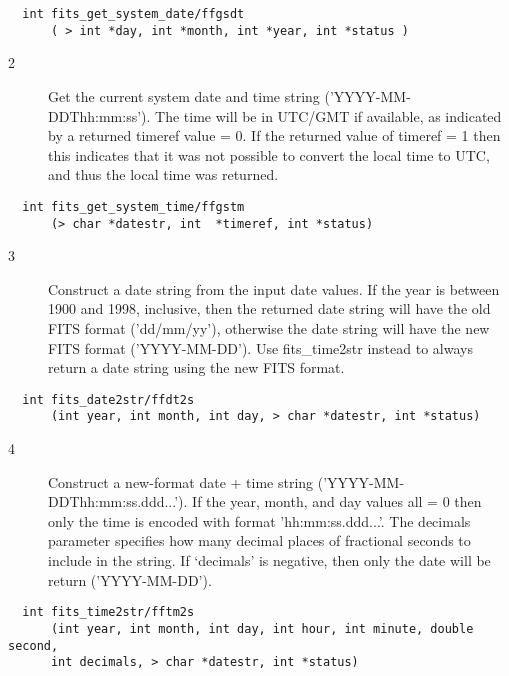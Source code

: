 \documentclass[11pt]{book}
\begin{document}
\begin{verbatim}
  int fits_get_system_date/ffgsdt
      ( > int *day, int *month, int *year, int *status )
\end{verbatim}


\begin{description}
\item[2 ] Get the current system date and time string ('YYYY-MM-DDThh:mm:ss').
The time will be in UTC/GMT if available, as indicated by a returned timeref
value = 0.  If the returned value of timeref = 1 then this indicates that
it was not possible to convert the local time to UTC, and thus the local
time was returned.
\end{description}

\begin{verbatim}
  int fits_get_system_time/ffgstm
      (> char *datestr, int  *timeref, int *status)
\end{verbatim}


\begin{description}
\item[3 ] Construct a date string from the input date values.  If the year
is between 1900 and 1998, inclusive, then the returned date string will
have the old FITS format ('dd/mm/yy'), otherwise the date string will
have the new FITS format ('YYYY-MM-DD').  Use fits\_time2str instead
 to always return a date string using the new FITS format. \label{ffdt2s}
\end{description}

\begin{verbatim}
  int fits_date2str/ffdt2s
      (int year, int month, int day, > char *datestr, int *status)
\end{verbatim}


\begin{description}
\item[4 ] Construct a new-format date + time string ('YYYY-MM-DDThh:mm:ss.ddd...').
  If the year, month, and day values all = 0 then only the time is encoded
  with format 'hh:mm:ss.ddd...'.  The decimals parameter specifies how many
  decimal places of fractional seconds to include in the string.  If `decimals'
 is negative, then only the date will be return ('YYYY-MM-DD').
\end{description}

\begin{verbatim}
  int fits_time2str/fftm2s
      (int year, int month, int day, int hour, int minute, double second,
      int decimals, > char *datestr, int *status)
\end{verbatim}
\end{document}
